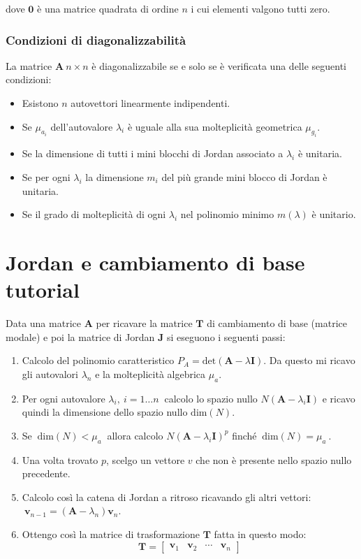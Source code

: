 \documentclass[a4paper]{article}
\renewcommand{\vec}{\bm}
\theoremstyle{definition}
\begin{document}
	 			dove $ \vec{0} $ è una matrice quadrata di ordine $ n $ i cui elementi valgono tutti zero.
 			
 			\subsubsection{Condizioni di diagonalizzabilità}
	 			La matrice $ \vec{A}\ n\times n $ è diagonalizzabile se e solo se è verificata una delle seguenti condizioni:
	 			\begin{itemize}
	 				\item Esistono $ n $ autovettori linearmente indipendenti.
	 				\item Se $ \mu_{a_i} $ dell'autovalore $ \lambda_i $ è uguale alla sua molteplicità geometrica $ \mu_{g_i} $.
	 				\item Se la dimensione di tutti i mini blocchi di Jordan associato a $ \lambda_i $ è unitaria.
	 				\item Se per ogni $ \lambda_i $ la dimensione $ m_i $ del più grande mini blocco di Jordan è unitaria.
	 				\item Se il grado di molteplicità di ogni $ \lambda_i $ nel polinomio minimo $ m(\lambda) $ è unitario.
	 			\end{itemize}
	 			
	 		
		\newpage
		
		\section{Jordan e cambiamento di base tutorial}
			Data una matrice $ \vec{A} $ per ricavare la matrice $ \vec{T} $ di cambiamento di base (matrice modale) e poi la matrice di Jordan $ \vec{J} $ si eseguono i seguenti passi:
			\begin{enumerate}
				\item Calcolo del polinomio caratteristico $ P_A = \text{det}(\vec{A} - \lambda \vec{I}) $. Da questo mi ricavo gli autovalori $ \lambda_n $ e la molteplicità algebrica $ \mu_a $.
				\item Per ogni autovalore $ \lambda_i,\ i= 1\dots n\ $ calcolo lo spazio nullo $ N(\vec{A} - \lambda_i\vec{I}) $ e ricavo quindi la dimensione dello spazio nullo $ \text{dim}(N) $.
				\item Se $\ \text{dim}(N) < \mu_a\ $ allora calcolo $ N(\vec{A} - \lambda_i\vec{I})^p $ finché $\ \text{dim}(N) = \mu_a\ $.
				\item Una volta trovato $ p $, scelgo un vettore $ v $ che non è presente nello spazio nullo precedente.
				\item Calcolo così la catena di Jordan a ritroso ricavando gli altri vettori: 
				$\ \vec{v}_{n-1} = (\vec{A} - \lambda_n)\vec{v}_n $.
				\item Ottengo così la matrice di trasformazione $ \vec{T} $ fatta in questo modo:
				\[
					\vec{T} =
					\begin{bmatrix}
						\vec{v}_1 & \vec{v}_2 & \cdots & \vec{v}_n
					\end{bmatrix}
				\]
			\end{enumerate}
			
\end{document}
